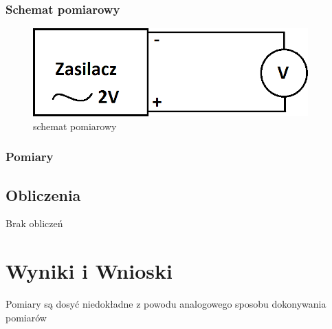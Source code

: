 \documentclass{article}  %
\begin{document}
            \subsubsection{Schemat pomiarowy}
                \begin{figure}[H]
                    \centering
                    \includegraphics{zas-woltanal}
                    \caption{schemat pomiarowy}
                \end{figure}
            \subsubsection{Pomiary}
                \begin{table}[H]
                    \centering
                \end{table}
        \subsection{Obliczenia}
            Brak obliczeń
    \section{Wyniki i Wnioski}
    Pomiary są dosyć niedokładne z powodu analogowego sposobu dokonywania pomiarów
\end{document}
